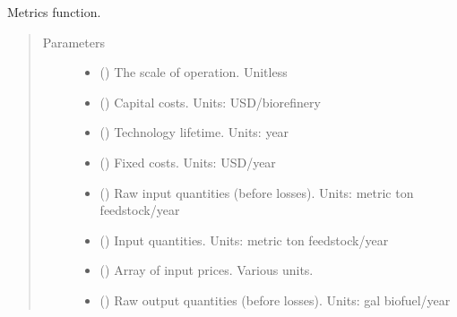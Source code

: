 \documentclass[letterpaper,10pt,english]{sphinxmanual}
\begin{document}
\begin{fulllineitems}
\label{\detokenize{technology:technology.tutorial_biorefinery.metrics}}
Metrics function.
\begin{quote}\begin{description}
\item[{Parameters}] \leavevmode\begin{itemize}
\item {} 
 () \textendash{} The scale of operation. Unitless

\item {} 
 () \textendash{} Capital costs. Units: USD/biorefinery

\item {} 
 () \textendash{} Technology lifetime. Units: year

\item {} 
 () \textendash{} Fixed costs. Units: USD/year

\item {} 
 () \textendash{} Raw input quantities (before losses). Units: metric ton feedstock/year

\item {} 
 () \textendash{} Input quantities. Units: metric ton feedstock/year

\item {} 
 () \textendash{} Array of input prices. Various units.

\item {} 
 () \textendash{} Raw output quantities (before losses). Units: gal biofuel/year


\end{itemize}
\end{description}
\end{quote}
\end{fulllineitems}
\end{document}
